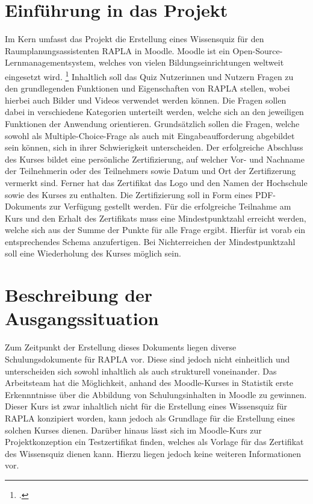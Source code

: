 \section{Einführung in das Projekt}
Im Kern umfasst das Projekt die Erstellung eines Wissensquiz für den Raumplanungsassistenten \acs{RAPLA} in Moodle.
Moodle ist ein Open-Source-Lernmanagementsystem, welches von vielen Bildungseinrichtungen weltweit eingesetzt wird.
\footcite[Vgl.][S. 1 f.]{goepelDeutscheDatenschutzaspekteBei2008}
Inhaltlich soll das Quiz Nutzerinnen und Nutzern Fragen zu den grundlegenden Funktionen und Eigenschaften von \acs{RAPLA} stellen, wobei
hierbei auch Bilder und Videos verwendet werden können. Die Fragen sollen dabei in verschiedene Kategorien unterteilt werden, welche
sich an den jeweiligen Funktionen der Anwendung orientieren. Grundsätzlich sollen die Fragen, welche
sowohl als Multiple-Choice-Frage als auch mit Eingabeaufforderung abgebildet sein können, sich in ihrer Schwierigkeit unterscheiden.
Der erfolgreiche Abschluss des Kurses bildet eine persönliche Zertifizierung, auf welcher Vor- und Nachname
der Teilnehmerin oder des Teilnehmers sowie Datum und Ort der Zertifizerung vermerkt sind.
Ferner hat das Zertifikat das Logo und den Namen der Hochschule sowie des Kurses zu enthalten. Die Zertifizierung soll in Form eines PDF-Dokuments
zur Verfügung gestellt werden. Für die erfolgreiche Teilnahme am Kurs und den Erhalt des Zertifikats muss eine Mindestpunktzahl erreicht werden,
welche sich aus der Summe der Punkte für alle Frage ergibt. Hierfür ist vorab 
ein entsprechendes Schema anzufertigen. Bei Nichterreichen der Mindestpunktzahl soll eine Wiederholung des Kurses möglich sein.
\section{Beschreibung der Ausgangssituation}
Zum Zeitpunkt der Erstellung dieses Dokuments liegen diverse Schulungsdokumente für \acs{RAPLA} vor.
Diese sind jedoch nicht einheitlich und unterscheiden sich sowohl inhaltlich als auch strukturell voneinander.
Das Arbeitsteam hat die Möglichkeit, anhand des Moodle-Kurses in Statistik erste Erkennntnisse über die Abbildung
von Schulungsinhalten in Moodle zu gewinnen. Dieser Kurs ist zwar inhaltlich nicht für die Erstellung eines Wissensquiz
für \acs{RAPLA} konzipiert worden, kann jedoch als Grundlage für die Erstellung eines solchen Kurses dienen.
Darüber hinaus lässt sich im Moodle-Kurs zur Projektkonzeption ein Testzertifikat finden, welches als Vorlage für das
Zertifikat des Wissensquiz dienen kann. Hierzu liegen jedoch keine weiteren Informationen vor.
